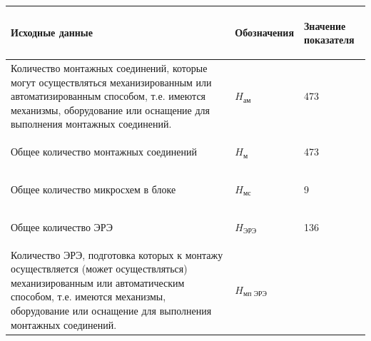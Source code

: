 \begin{table}
    \centering
    \begin{tabular}{|p{9cm}|p{3cm}|p{3cm}|}
        \hline
        \begin{center} Исходные данные \end{center}
        & \begin{center} Обозначения \end{center}
        & \begin{center} Значение показателя\end{center} \\
        \hline
        Количество монтажных соединений, которые могут осуществляться
        механизированным или автоматизированным способом,
        т.е. имеются механизмы, оборудование или оснащение для
        выполнения монтажных соединений.
        & \begin{center} $H_{\text{ам}}$\end{center}
        & \begin{center} 473 \end{center} \\
        \hline
        Общее количество монтажных соединений
        & \begin{center} $H_{\text{м}}$\end{center}
        & \begin{center} 473 \end{center} \\
        \hline
        Общее количество микросхем в блоке
        & \begin{center} $H_{\text{мс}}$\end{center}
        & \begin{center} 9 \end{center} \\
        \hline
        Общее количество ЭРЭ
        & \begin{center} $H_{\text{ЭРЭ}}$\end{center}
        & \begin{center} 136 \end{center} \\
        \hline
        Количество ЭРЭ, подготовка которых к монтажу осуществляется (может
        осуществляться) механизированным или автоматическим способом,
        т.е. имеются механизмы, оборудование или оснащение для выполнения
        монтажных соединений.
        & \begin{center} $H_{\text{мп ЭРЭ}}$ \end{center}

\end{tabular}
\end{table}

